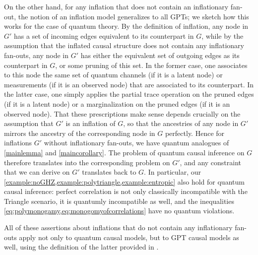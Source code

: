\documentclass[aps,english,10pt,superscriptaddress,onecolumn,twoside,longbibliography,pra,floatfix,fleqn,nofootinbib]{revtex4-1}
\theoremstyle{definition}
\newcounter{example}[section]
\begin{document}
On the other hand, for any inflation that does not contain an inflationary fan-out, the notion of an inflation model generalizes to all GPTs; we sketch how this works for the case of quantum theory.  By the definition of inflation, any node in $G'$ has a set of incoming edges equivalent to its counterpart in $G$, while by the assumption that the inflated causal structure does not contain any inflationary fan-outs, any node in $G'$ has either the equivalent set of outgoing edges as its counterpart in $G$, or some pruning of this set.  In the former case, 
one associates to this node the same set of quantum channels (if it is a latent node) or measurements (if it is an observed node) that are associated to its counterpart. In the latter case, one simply applies the partial trace operation on the pruned edges (if it is a latent node) or a marginalization on the pruned edges (if it is an observed node).  
That these prescriptions make sense depends crucially on the assumption that $G'$ is an inflation of $G$, so that the ancestries of any node in $G'$ mirrors the ancestry of the corresponding node in $G$ perfectly. Hence for inflations $G'$ without inflationary fan-outs, we have quantum analogues of \cref{mainlemma} and \cref{maincorollary}. The problem of quantum causal inference on $G$ therefore translates into the corresponding problem on $G'$, and any constraint that we can derive on $G'$ translates back to $G$. In particular, our \cref{example:noGHZ,example:polytriangle,example:entropic} also hold for quantum causal inference: perfect correlation is not only classically incompatible with the Triangle scenario, it is quantumly incompatible as well, and the inequalities \cref{eq:polymonogamy,eq:monogomyofcorrelations} have no quantum violations. 

All of these assertions about inflations that do not contain any inflationary fan-outs apply not only to quantum causal models, but to GPT causal models as well, using the definition of the latter provided in \cite{pusey2014gdag}.  
\end{document}
